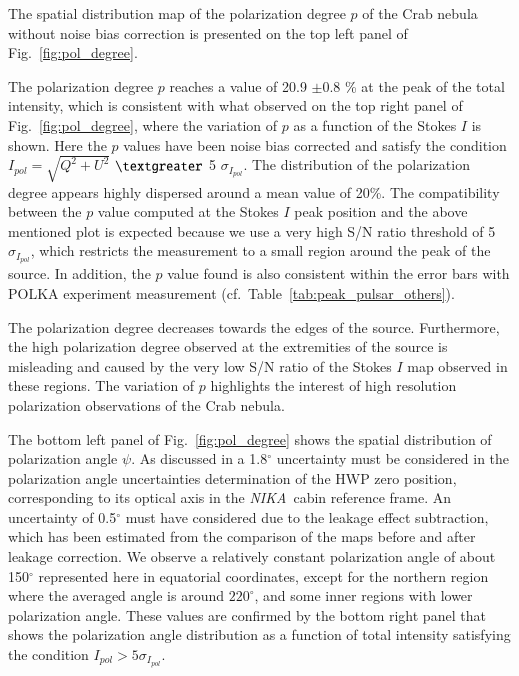 \documentclass[twocolumn,traditabstract]{aa}
\def\NIKA{\textit{NIKA}}
\begin{document}
The spatial distribution map of the polarization degree $p$ of the Crab nebula
without noise bias correction is presented on the top left panel of
Fig.~\ref{fig:pol_degree}. 

The polarization degree $p$ reaches a value of 20.9 $\pm$0.8 \% at
the peak of the total intensity, which is consistent with what observed on the
top right panel of Fig.~\ref{fig:pol_degree}, where the variation of $p$ as a
function of the Stokes $I$ is shown.  Here the $p$ values have been noise bias
corrected and satisfy the condition $I_{pol}=\sqrt{Q^2+U^2}$ $\textgreater$ 5
$\sigma_{I_{pol}}$. The distribution of the polarization degree appears highly
dispersed around a mean value of 20\%.  The compatibility between the $p$ value
computed at the Stokes $I$ peak position and the above mentioned plot is
expected because we use a very high S/N ratio threshold of 5 $\sigma_{I_{pol}}$,
which restricts the measurement to a small region around the peak of the source.
In addition, the $p$ value found is also consistent within the error bars with
POLKA experiment measurement \citep{2014PASP..126.1027W} (cf.~Table~\ref{tab:peak_pulsar_others}).

The polarization degree decreases towards the edges of the
source. Furthermore, the high polarization degree observed at the extremities of the source is misleading and caused by the very low S/N ratio of the Stokes $I$ map observed in these regions. The variation of $p$ highlights the interest of high resolution polarization
observations of the Crab nebula. 

The bottom left panel of Fig.~\ref{fig:pol_degree} shows the spatial distribution of polarization angle
$\psi$. As discussed in \cite{ritacco2017} a 1.8$^{\circ}$ uncertainty must be considered in the polarization angle uncertainties determination of the HWP zero position, corresponding to its optical axis in the \NIKA\ cabin reference frame. An uncertainty of 0.5$^{\circ}$ must have considered due to the leakage effect subtraction, which has been estimated from the comparison of the maps before and after leakage correction. We observe a relatively constant polarization
angle of about 150$^{\circ}$ represented here in equatorial coordinates, except
for the northern region where the averaged angle is around $220^{\circ}$, and
some inner regions with lower polarization angle.  These values are confirmed by
the bottom right panel that shows the polarization angle distribution as a
function of total intensity satisfying the condition $I_{pol} > 5\sigma_{I_{pol}}$.
\end{document}
